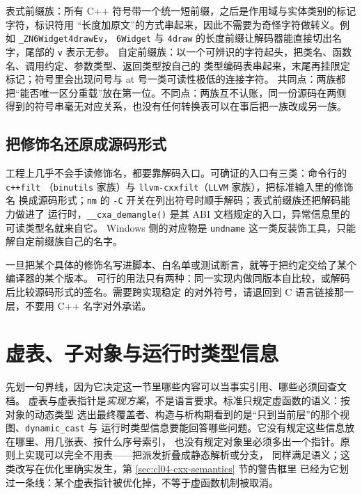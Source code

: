 \documentclass[12pt,a4paper,fontset=fandol]{ctexbook}
\newcommand{\Fn}[1]{\texttt{#1()}}
\newcommand{\Tp}[1]{\texttt{#1}}
\newcommand{\Lang}[1]{\textsf{#1}}
\newcommand{\CL}{\Lang{C}}
\newcommand{\CPP}{\Lang{C++}}
\newcommand{\Tool}[1]{\texttt{#1}}
\newcommand{\Sw}[1]{\texttt{#1}}
\newcommand{\Sym}[1]{\texttt{#1}}
\newcommand{\Win}{\textsf{Windows}}
\begin{document}
\begin{compare}[title={两族修饰形态的差异}]
表式前缀族：所有 \CPP{} 符号带一个统一短前缀，之后是作用域与实体类别的标记字符，标识符用
“长度加原文”的方式串起来，因此不需要为奇怪字符做转义。例如 \Sym{\_ZN6Widget4drawEv}，
\Tp{6Widget} 与 \Tp{4draw} 的长度前缀让解码器能直接切出名字，尾部的 \Tp{v} 表示无参。
自定前缀族：以一个可辨识的字符起头，把类名、函数名、调用约定、参数类型、返回类型按自己的
类型编码表串起来，末尾再挂限定标记；符号里会出现问号与 at 号一类可读性极低的连接字符。
共同点：两族都把“能否唯一区分重载”放在第一位。不同点：两族互不认账，同一份源码在两侧
得到的符号串毫无对应关系，也没有任何转换表可以在事后把一族改成另一族。
\end{compare}

\subsection{把修饰名还原成源码形式}\label{sec:cl13-demangle}

工程上几乎不会手读修饰名，都要靠解码入口。可确证的入口有三类：命令行的 \Tool{c++filt}
（\Tool{binutils} 家族）与 \Tool{llvm-cxxfilt}（\Tool{LLVM} 家族），把标准输入里的修饰名
换成源码形式；\Tool{nm} 的 \Sw{-C} 开关在列出符号时顺手解码；表式前缀族还把解码能力做进了
运行时，\Fn{\_\_cxa\_demangle} 是其 ABI 文档规定的入口，异常信息里的可读类型名就来自它。
\Win{} 侧的对应物是 \Tool{undname} 这一类反装饰工具，只能解自定前缀族自己的名字。

\begin{warning}[title={修饰名不是跨实现的合同}]
一旦把某个具体的修饰名写进脚本、白名单或测试断言，就等于把约定交给了某个编译器的某个版本。
可行的用法只有两种：同一实现内做同版本自比较，或解码后比较源码形式的签名。需要跨实现稳定
的对外符号，请退回到 \CL{} 语言链接那一层，不要用 \CPP{} 名字对外承诺。
\end{warning}

\section{虚表、子对象与运行时类型信息}\label{sec:cl13-vtable}

先划一句界线，因为它决定这一节里哪些内容可以当事实引用、哪些必须回查文档。
虚表与虚表指针是\emph{实现方案}，不是语言要求。标准只规定虚函数的语义：按对象的动态类型
选出最终覆盖者、构造与析构期看到的是“只到当前层”的那个视图、\Tp{dynamic\_cast} 与
运行时类型信息要能回答哪些问题。它没有规定这些信息放在哪里、用几张表、按什么序号索引，
也没有规定对象里必须多出一个指针。原则上实现可以完全不用表——把派发折叠成静态解析或分支，
同样满足语义；这类改写在优化里确实发生，第 \ref{sec:cl04-cxx-semantics} 节的警告框里
已经为它划过一条线：某个虚表指针被优化掉，不等于虚函数机制被取消。
\end{document}

